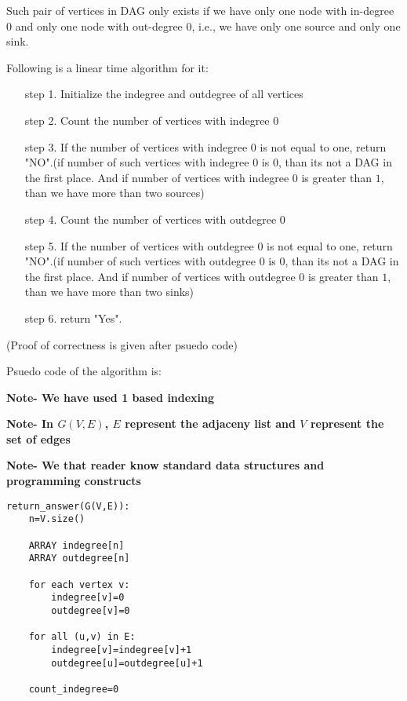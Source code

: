\documentclass[answers]{exam}
\begin{document}
\begin{questions}
\begin{parts}
\begin{solution}
Such pair of vertices in DAG only exists if we have only one node with in-degree $0$ and only one node with out-degree $0$, i.e., we have only one source and only one sink.

Following is a linear time algorithm for it:
\begin{enumerate}
    \item [step 1.] Initialize the indegree and outdegree of all vertices 
    \item [step 2.] Count the number of vertices with indegree $0$
    \item [step 3.] If the number of vertices with indegree $0$ is not equal to one, return "NO".(if number of such vertices with indegree $0$ is $0$, than its not a DAG in the first place. And if number of vertices with indegree $0$ is greater than $1$, than we have more than two sources)
    \item [step 4.] Count the number of vertices with outdegree $0$
    \item [step 5.] If the number of vertices with outdegree $0$ is not equal to one, return "NO".(if number of such vertices with outdegree $0$ is $0$, than its not a DAG in the first place. And if number of vertices with outdegree $0$ is greater than $1$, than we have more than two sinks)
    \item[step 6.] return "Yes".
\end{enumerate}

(Proof of correctness is given after psuedo code)

\par Psuedo code of the algorithm is:
\par
\textbf{Note- We have used 1 based indexing }

\par
\textbf{Note- In $G(V,E)$, $E$ represent the adjaceny list and $V$ represent the set of edges}
\par
\textbf{Note- We that reader know standard data structures and programming constructs}
\par
\begin{verbatim}
return_answer(G(V,E)):
    n=V.size()

    ARRAY indegree[n]
    ARRAY outdegree[n]

    for each vertex v:
        indegree[v]=0
        outdegree[v]=0
    
    for all (u,v) in E:
        indegree[v]=indegree[v]+1
        outdegree[u]=outdegree[u]+1
    
    count_indegree=0


\end{verbatim}
\end{solution}
\end{parts}
\end{questions}
\end{document}
